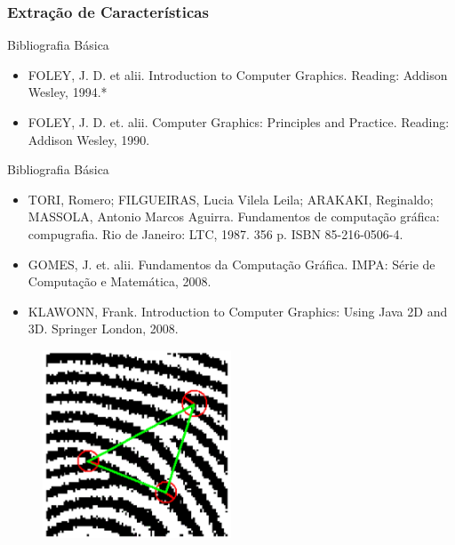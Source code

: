 \documentclass{beamer}
\begin{document}

\begin{frame}
\frametitle{Extração de Características}
		\begin{block}{Bibliografia Básica}
			
			\begin{itemize}
				\item FOLEY, J. D. et alii. Introduction to Computer Graphics. Reading: Addison Wesley, 1994.*
				\item FOLEY, J. D. et. alii. Computer Graphics: Principles and Practice. Reading: Addison Wesley, 1990. 
			\end{itemize}

		\end{block}
		
		\begin{block}{Bibliografia Básica}
			
			\begin{itemize}
				\item TORI, Romero; FILGUEIRAS, Lucia Vilela Leila; ARAKAKI, Reginaldo; MASSOLA, Antonio Marcos Aguirra. Fundamentos de computação gráfica: compugrafia. Rio de Janeiro: LTC, 1987. 356 p. ISBN 85-216-0506-4.
				
				\item GOMES, J. et. alii. Fundamentos da Computação Gráfica. IMPA: Série de Computação e Matemática, 2008.
				
				\item KLAWONN, Frank. Introduction to Computer Graphics: Using Java 2D and 3D. Springer London, 2008. 
			\end{itemize}

		\end{block}

	\begin{figure}[!h]
		\begin{center}
			\includegraphics[width=0.5\textwidth]{Figures/semelhancas}
		\end{center}
		
	\end{figure}
	
\end{frame}

\end{document}
